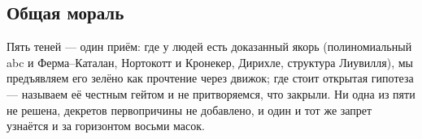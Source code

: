 \subsection{Общая мораль}

Пять теней — один приём: где у людей есть доказанный якорь (полиномиальный abc и Ферма–Каталан,
Нортокотт и Кронекер, Дирихле, структура Лиувилля), мы предъявляем его зелёно как прочтение через
движок; где стоит открытая гипотеза — называем её честным гейтом и не притворяемся, что закрыли. Ни
одна из пяти не решена, декретов первопричины не добавлено, и один и тот же запрет узнаётся и за
горизонтом восьми масок.
